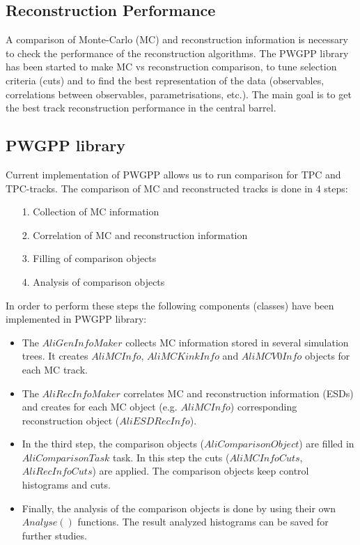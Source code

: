 \documentclass{elsart}
\begin{document}
\subsection{Reconstruction Performance}

A comparison of Monte-Carlo (MC) and reconstruction information is necessary to 
check the performance of the reconstruction algorithms. The PWGPP library has been started to make 
MC vs reconstruction comparison, to tune selection criteria (cuts) and to find the best representation 
of the data (observables, correlations between observables, parametrisations, etc.). The main goal is to 
get the best track reconstruction performance in the central barrel.   

\subsection{PWGPP library}

Current implementation of PWGPP allows us to run comparison for TPC and TPC-tracks.
The comparison of MC and reconstructed tracks is done in 4 steps: 

\begin{itemize}
\item[1.] Collection of MC information
\item[2.] Correlation of MC and reconstruction information
\item[3.] Filling of comparison objects
\item[4.] Analysis of comparison objects
\end{itemize}
 
In order to perform these steps the following 
components (classes) have been implemented in PWGPP library:

\begin{itemize}
\item The $AliGenInfoMaker$ collects MC information stored in 
 several simulation trees. It creates $AliMCInfo$, $AliMCKinkInfo$ and $AliMCV0Info$ objects for each MC track.  
\item The $AliRecInfoMaker$ correlates MC and reconstruction information (ESDs) and creates for each MC object (e.g. $AliMCInfo$) corresponding reconstruction object ($AliESDRecInfo$). 
\item In the third step, the comparison objects ($AliComparisonObject$)  are filled in $AliComparisonTask$ task. In this step the cuts ($AliMCInfoCuts$, $AliRecInfoCuts$) are applied. The comparison objects keep control histograms and cuts. 
\item Finally, the analysis of the comparison objects is done by using their own $Analyse()$ 
      functions. The result analyzed histograms can be saved for further studies.
\end{itemize}
 
\end{document}

